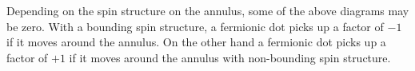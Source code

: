 \documentclass[12pt,a4paper]{article}
\newcommand{\kw}[1]{{\color{kwcolor}\footnotesize{(KW) #1}}}
\newcommand{\dave}[1]{{\color{ao(english)}\footnotesize{(DA) #1}}}
\begin{document}

Depending on the spin structure on the annulus, some of the above diagrams may be zero.
With a bounding spin structure, a fermionic dot picks up a factor of $-1$ if it moves around the annulus.
On the other hand a fermionic dot picks up a factor of $+1$ if it moves around the annulus with non-bounding spin structure.

\end{document}
